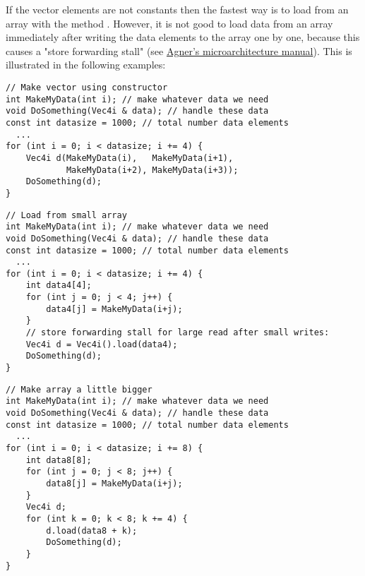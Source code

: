\documentclass[vcl_manual.tex]{subfiles}
\begin{document}
If the vector elements are not constants then the fastest way is to load from an array with the method . However, it is not good to load data from an array immediately after writing the data elements to the array one by one, because this causes a "store forwarding stall" (see \href{https://www.agner.org/optimize/#manual_cpp}{Agner's microarchitecture manual}). This is illustrated in the following examples:

\begin{example}
\label{exampleArrayLoopV}
\end{example}
\begin{lstlisting}[frame=single]
// Make vector using constructor
int MakeMyData(int i); // make whatever data we need
void DoSomething(Vec4i & data); // handle these data
const int datasize = 1000; // total number data elements
  ...
for (int i = 0; i < datasize; i += 4) {
    Vec4i d(MakeMyData(i),   MakeMyData(i+1),
            MakeMyData(i+2), MakeMyData(i+3));
    DoSomething(d);
}
\end{lstlisting}


\begin{example}
\label{exampleArrayLoopW}
\end{example}
\begin{lstlisting}[frame=single]
// Load from small array
int MakeMyData(int i); // make whatever data we need
void DoSomething(Vec4i & data); // handle these data
const int datasize = 1000; // total number data elements
  ...
for (int i = 0; i < datasize; i += 4) {
    int data4[4];
    for (int j = 0; j < 4; j++) {
        data4[j] = MakeMyData(i+j); 
    }
    // store forwarding stall for large read after small writes:
    Vec4i d = Vec4i().load(data4);
    DoSomething(d);
}
\end{lstlisting}


\begin{example}
\label{exampleArrayLoopX}
\end{example}
\begin{lstlisting}[frame=single]
// Make array a little bigger
int MakeMyData(int i); // make whatever data we need
void DoSomething(Vec4i & data); // handle these data
const int datasize = 1000; // total number data elements
  ...
for (int i = 0; i < datasize; i += 8) {
    int data8[8];
    for (int j = 0; j < 8; j++) {
        data8[j] = MakeMyData(i+j); 
    }
    Vec4i d;
    for (int k = 0; k < 8; k += 4) {
        d.load(data8 + k);
        DoSomething(d);
    }
}
\end{lstlisting}
\end{document}
